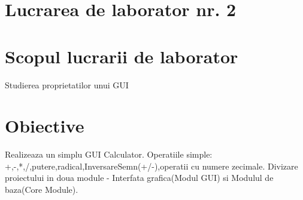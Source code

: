 \section*{Lucrarea de laborator nr. 2}

\section{Scopul lucrarii de laborator}
Studierea proprietatilor unui GUI
\section{Obiective}
Realizeaza un simplu GUI Calculator.
Operatiile simple: +,-,*,/,putere,radical,InversareSemn(+/-),operatii cu numere zecimale.
Divizare proiectului in doua module - Interfata grafica(Modul GUI) si Modulul de baza(Core Module).


